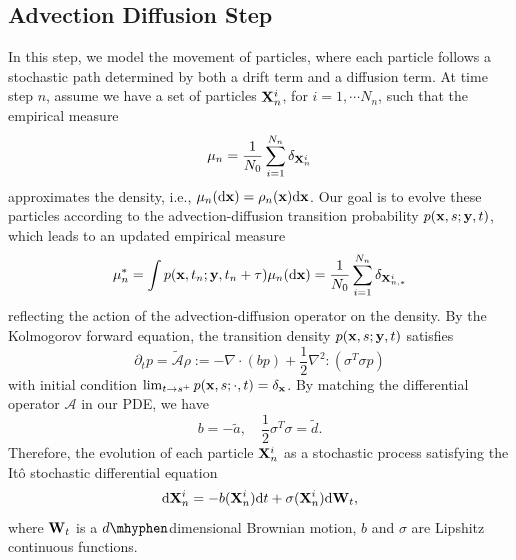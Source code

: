 \documentclass[12pt]{article}
\begin{document}
\subsection{Advection Diffusion Step}
In this step, we model the movement of particles, where each particle follows a stochastic path determined by both a drift term and a diffusion term. At time step $n$, assume we have a set of particles 
$\mathbf{X}^i_n$, for $i=1,\cdots N_n$, such that the empirical measure 
\[
\mu_n= \frac{1}{N_0}\sum_{i=1}^{N_n}\delta_{\mathbf{X}_n^i}
\] 
approximates the density, i.e.,  $\mu_n(\mathrm{d} \mathbf{x}) = \rho_n(\mathbf{x})\mathrm{d} \mathbf{x}$. 
Our goal is to evolve these particles according to the advection-diffusion transition probability $p(\mathbf{x},s;\mathbf{y},t)$, which leads to an updated empirical measure
\[\mu_n^* = \int p(\mathbf{x},t_n;\mathbf{y},t_n+\tau)  \mu_n(\mathrm{d} \mathbf{x}) =   \frac{1}{N_0}\sum_{i=1}^{N_n}\delta_{\mathbf{X}_{n,*}^i}
\]  
reflecting the action of the advection-diffusion operator on the density.
By the Kolmogorov forward equation, the transition density $p(\mathbf{x},s;\mathbf{y},t)$ satisfies 
\begin{equation}
    \partial_t p = \tilde {\mathcal A }\rho := - \nabla \cdot(b  p) + \frac{1}{2}\nabla^2:(\sigma^T\sigma p) 
\end{equation}
with initial condition $\lim_{t\to s^+} p(\mathbf{x},s;\cdot,t) = \delta_{\mathbf{x}}$. By matching the differential operator $\mathcal A$ in our PDE, we have 
\begin{equation}
    b = -\tilde a, \quad \frac{1}{2}\sigma^T \sigma = \tilde d.
\end{equation}
Therefore, the evolution of each particle $\mathbf{X}^i_n$ as a stochastic process satisfying the It\^o stochastic differential equation
\begin{equation}\label{equ:overd_langevin}
    \mathrm{d} \mathbf{X}_n^i = - b(\mathbf{X}_n^i) \mathrm{d} t  + \sigma(\mathbf{X}_n^i) \mathrm{d} \mathbf{W}_t,
\end{equation}
where $\mathbf{W}_t$ is a $d\mhyphen$dimensional Brownian motion, $b$ and $\sigma$ are Lipshitz continuous functions.
\end{document}
